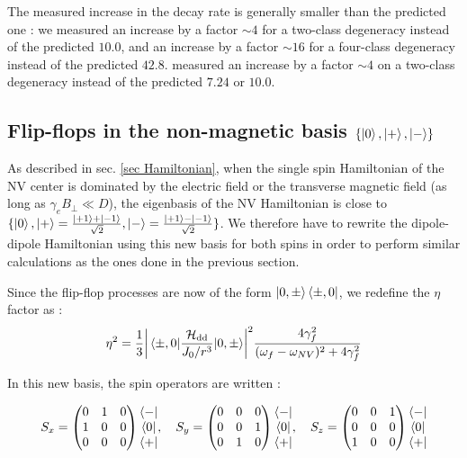 \documentclass[preprintnumbers,amsmath,amssymb,onecolumn,12pt]{revtex4-2}\usepackage{graphicx}%
\begin{document}
The measured increase in the decay rate is generally smaller than the predicted one : we measured an increase by a factor $\sim 4$ for a two-class degeneracy instead of the predicted $10.0$, and an increase by a factor $\sim 16$ for a four-class degeneracy instead of the predicted $42.8$. \cite{choi_depolarization_2017} measured an increase by a factor $\sim 4$ on a two-class degeneracy instead of the predicted $7.24$ or $10.0$.

\subsection{Flip-flops in the non-magnetic basis $\{ \ket{0},\ket{+},\ket{-} \} $}

As described in sec. \ref{sec Hamiltonian}, when the single spin Hamiltonian of the NV center is dominated by the electric field or the transverse magnetic field (as long as $\gamma_e B_\perp \ll D$), the eigenbasis of the NV Hamiltonian is close to $\{\ket{0},\ket{+}=\frac{\ket{+1}+\ket{-1}}{\sqrt{2}},\ket{-}=\frac{\ket{+1}-\ket{-1}}{\sqrt{2}} \} $. We therefore have to rewrite the dipole-dipole Hamiltonian using this new basis for both spins in order to perform similar calculations as the ones done in the previous section.

Since the flip-flop processes are now of the form $\ket{0,\pm}\bra{\pm,0}$, we redefine the $\eta$ factor as :
\begin{equation}
\eta^2=\frac{1}{3} \abs{\mel{\pm ,0}{\frac{\mathcal{H}_{\rm dd}}{J_0/r^3}}{0,\pm }}^2  \frac{4\gamma_f^2}{(\omega_f - \omega_{NV})^2+4\gamma_f^2}
\end{equation}

In this new basis, the spin operators are written :

\begin{equation}
  S_x = \begin{pmatrix}
  0&1&0 \\
  1&0&0 \\
  0&0&0
  \end{pmatrix}
  \begin{matrix}
  \bra{-} \\
  \bra{0} \\
  \bra{+}
  \end{matrix}  
  , \quad 
 S_y = \begin{pmatrix}
  0&0&0 \\
  0&0&1 \\
  0&1&0
  \end{pmatrix}
  \begin{matrix}
  \bra{-} \\
  \bra{0} \\
  \bra{+}
  \end{matrix}  
 , \quad 
  S_z = \begin{pmatrix}
  0&0&1 \\
  0&0&0\\
  1&0&0
  \end{pmatrix}
  \begin{matrix}
  \bra{-} \\
  \bra{0} \\
  \bra{+}
  \end{matrix}
  \end{equation}
\end{document}
